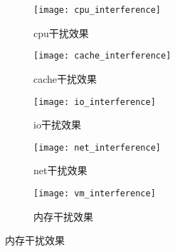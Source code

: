 \begin{figure}[H]
  \centering
  \begin{subfigure}[b]{0.32\textwidth}
    \texttt{[image: cpu\_interference]}
    \caption{cpu干扰效果}
    \label{fig:cpu_interference}
  \end{subfigure}
  \begin{subfigure}[b]{0.32\textwidth}
    \texttt{[image: cache\_interference]}
    \caption{cache干扰效果}
    \label{fig:cache_interference}
  \end{subfigure}
  \begin{subfigure}[b]{0.32\textwidth}
    \texttt{[image: io\_interference]}
    \caption{io干扰效果}
    \label{fig:io_interference}
  \end{subfigure}
  \begin{subfigure}[b]{0.32\textwidth}
    \texttt{[image: net\_interference]}
    \caption{net干扰效果}
    \label{fig:net_interference}
  \end{subfigure}
  \begin{subfigure}[b]{0.32\textwidth}
    \texttt{[image: vm\_interference]}
    \caption{内存干扰效果}
    \label{fig:vm_interference}
  \end{subfigure}
  \label{fig:interference}
\end{figure}

